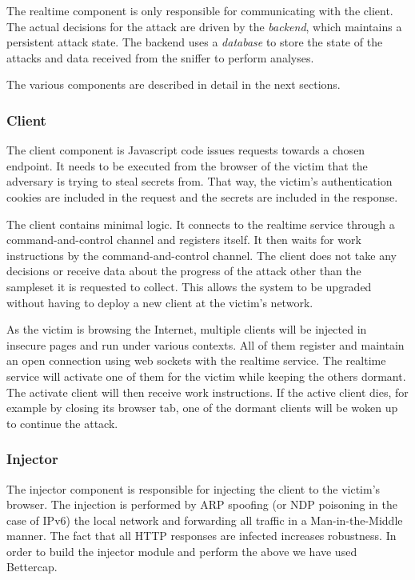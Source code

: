The realtime component is only responsible for communicating with the client.
The actual decisions for the attack are driven by the \textit{backend}, which
maintains a persistent attack state. The backend uses a \textit{database} to
store the state of the attacks and data received from the sniffer to perform
analyses.

The various components are described in detail in the next sections.

\subsubsection{Client}

The client component is Javascript code issues requests towards a chosen
endpoint. It needs to be executed from the browser of the victim that the
adversary is trying to steal secrets from. That way, the victim's authentication
cookies are included in the request and the secrets are included in the
response.

The client contains minimal logic. It connects to the realtime service through a
command-and-control channel and registers itself. It then waits for work
instructions by the command-and-control channel. The client does not take any
decisions or receive data about the progress of the attack other than the
sampleset it is requested to collect. This allows the system to be upgraded
without having to deploy a new client at the victim's network.

As the victim is browsing the Internet, multiple clients will be injected in
insecure pages and run under various contexts. All of them register and maintain
an open connection using web sockets with the realtime service. The realtime service
will activate one of them for the victim while keeping the others dormant. The
activate client will then receive work instructions. If the active client dies, for
example by closing its browser tab, one of the dormant clients will be woken up
to continue the attack.

\subsubsection{Injector}

The injector component is responsible for injecting the client to the victim's
browser. The injection is performed by ARP spoofing (or NDP poisoning in the
case of IPv6) the local network and forwarding all traffic in a
Man-in-the-Middle manner. The fact that all HTTP responses are infected
increases robustness. In order to build the injector module and perform the
above we have used Bettercap.

